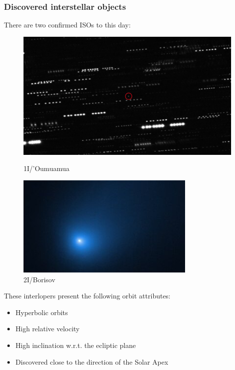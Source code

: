 \documentclass[xcolor={dvipsnames}]{beamer}
\begin{document}
\begin{frame}
\frametitle{Discovered interstellar objects}

There are two confirmed ISOs to this day:

\begin{figure}
    \centering
    \begin{minipage}{0.45\textwidth}
        \centering
        \includegraphics[width=\textwidth]{fig/static/oumuamua/shape.png}
        \caption{1I/'Oumuamua}
        \label{fig:figure1}
    \end{minipage}
    \hfill
    \begin{minipage}{0.45\textwidth}
        \centering
        \includegraphics[width=\textwidth]{fig/static/borisov/shape.jpg}
        \caption{2I/Borisov}
        \label{fig:figure2}
    \end{minipage}
\end{figure}

\pause
\vspace{-0.25cm}
These interlopers present the following orbit attributes:
\vspace{0.25cm}

\begin{itemize}
    \item Hyperbolic orbits
    \item High relative velocity
    \item High inclination w.r.t. the ecliptic plane
    \item Discovered close to the direction of the Solar Apex
\end{itemize}

\end{frame}
\end{document}
